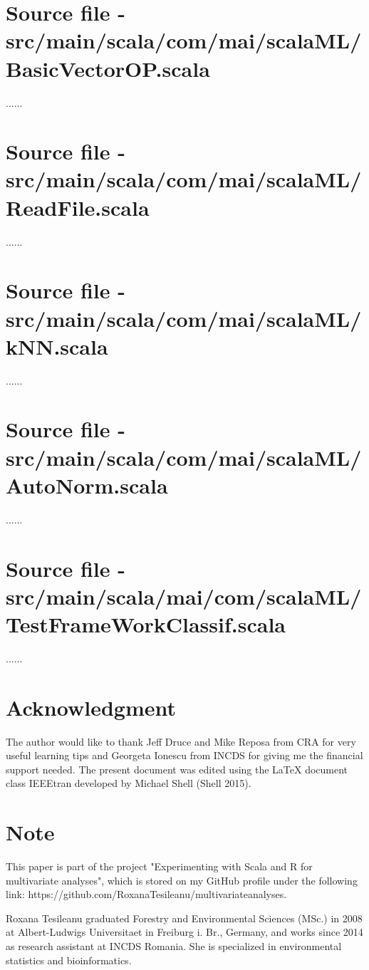 \documentclass[journal]{IEEEtran}
\begin{document}
\appendices
\section{Source file - src/main/scala/com/mai/scalaML/BasicVectorOP.scala}

......

\section{Source file - src/main/scala/com/mai/scalaML/ReadFile.scala}

......

\section{Source file - src/main/scala/com/mai/scalaML/kNN.scala}

......

\section{Source file - src/main/scala/com/mai/scalaML/AutoNorm.scala}

......

\section{Source file - src/main/scala/mai/com/scalaML/TestFrameWorkClassif.scala}

......

 

\section*{Acknowledgment}
The author would like to thank Jeff Druce and Mike Reposa from CRA for very useful learning tips and Georgeta Ionescu from INCDS for giving me the financial support needed. The present document was edited using the LaTeX document class IEEEtran developed by Michael Shell (Shell 2015).  

\section*{Note}
This paper is part of the project "Experimenting with Scala and R for multivariate analyses", which  is stored on my GitHub profile under the following link: https://github.com/RoxanaTesileanu/multivariate\underline{\space}analyses.  


\begin {IEEEbiographynophoto}{Roxana Tesileanu}
graduated Forestry and Environmental Sciences (MSc.) in 2008 at Albert-Ludwigs Universitaet in Freiburg i. Br., Germany, and works since 2014 as research assistant at INCDS Romania. She is specialized in environmental statistics and bioinformatics. 
\end{IEEEbiographynophoto}
\end{document}
